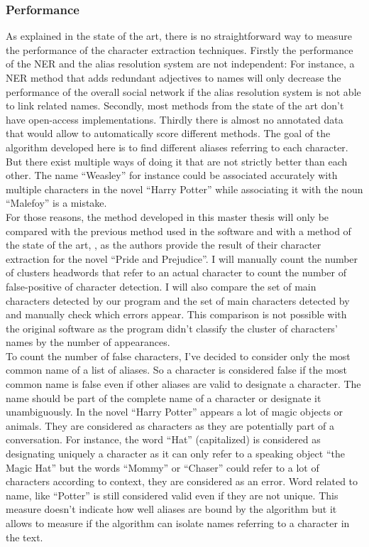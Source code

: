 \documentclass[a4paper, 12pt]{report}
\begin{document}
\subsubsection{Performance}
\label{performance}
As explained in the state of the art, there is no straightforward way to measure the performance of the character extraction techniques.
Firstly the performance of the NER and the alias resolution system are not independent:
For instance, a NER method that adds redundant adjectives to names will only decrease the performance of the overall social network
if the alias resolution system is not able to link related names.
Secondly, most methods from the state of the art don't have open-access implementations.
Thirdly there is almost no annotated data that would allow to automatically score different methods.
The goal of the algorithm developed here is to find different aliases referring to each character.
But there exist multiple ways of doing it that are not strictly better than each other.
The name ``Weasley'' for instance could be associated accurately with multiple characters in the novel ``Harry Potter'' while associating it with the noun ``Malefoy'' is a mistake.\\

For those reasons, the method developed in this master thesis will only be compared with the previous method used in the software \citep{original} and with a method of the state of the art, \cite{character_meta}, as the authors provide the result of their character extraction for the novel ``Pride and Prejudice''. I will manually count the number of clusters headwords that refer to an actual character to count the number of false-positive of character detection. I will also compare the set of main characters detected by our program and the set of main characters detected by \cite{character_meta} and manually check which errors appear. This comparison is not possible with the original software as the program didn't classify the cluster of characters' names by the number of appearances.\\

To count the number of false characters, I've decided to consider only the most common name of a list of aliases.
So a character is considered false if the most common name is false even if other aliases are valid to designate a character.
The name should be part of the complete name of a character or designate it unambiguously. In the novel ``Harry Potter'' appears a lot of magic objects or animals.
They are considered as characters as they are potentially part of a conversation.
For instance, the word ``Hat'' (capitalized) is considered as designating uniquely a character as it can only refer to a speaking object ``the Magic Hat''
but the words ``Mommy'' or ``Chaser'' could refer to a lot of characters according to context,
they are considered as an error. Word related to name, like ``Potter'' is still considered valid even if they are not unique.
This measure doesn't indicate how well aliases are bound by the algorithm but it allows to measure
if the algorithm can isolate names referring to a character in the text. \\
\end{document}
